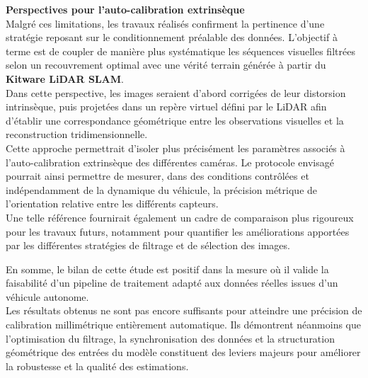 \documentclass[12pt,a4paper,oneside]{report}
\begin{document}
\hspace*{0.4cm}\textbf{Perspectives pour l'auto-calibration extrinsèque}\\

\hspace*{.3cm}Malgré ces limitations, les travaux réalisés confirment la pertinence d'une stratégie reposant sur le conditionnement préalable des données. L'objectif à terme est de coupler de manière plus systématique les séquences visuelles filtrées selon un recouvrement optimal avec une vérité terrain générée à partir du \textbf{Kitware LiDAR SLAM}.\\
\hspace*{.3cm}Dans cette perspective, les images seraient d'abord corrigées de leur distorsion intrinsèque, puis projetées dans un repère virtuel défini par le LiDAR afin d'établir une correspondance géométrique entre les observations visuelles et la reconstruction tridimensionnelle.\\

\hspace*{.3cm}Cette approche permettrait d'isoler plus précisément les paramètres associés à l'auto-calibration extrinsèque des différentes caméras. Le protocole envisagé pourrait ainsi permettre de mesurer, dans des conditions contrôlées et indépendamment de la dynamique du véhicule, la précision métrique de l'orientation relative entre les différents capteurs.\\
Une telle référence fournirait également un cadre de comparaison plus rigoureux pour les travaux futurs, notamment pour quantifier les améliorations apportées par les différentes stratégies de filtrage et de sélection des images.

\par\bigskip

\hspace*{.3cm}En somme, le bilan de cette étude est positif dans la mesure où il valide la faisabilité d'un pipeline de traitement adapté aux données réelles issues d'un véhicule autonome.\\
\hspace*{.3cm}Les résultats obtenus ne sont pas encore suffisants pour atteindre une précision de calibration millimétrique entièrement automatique. Ils démontrent néanmoins que l'optimisation du filtrage, la synchronisation des données et la structuration géométrique des entrées du modèle constituent des leviers majeurs pour améliorer la robustesse et la qualité des estimations.\\
\end{document}
